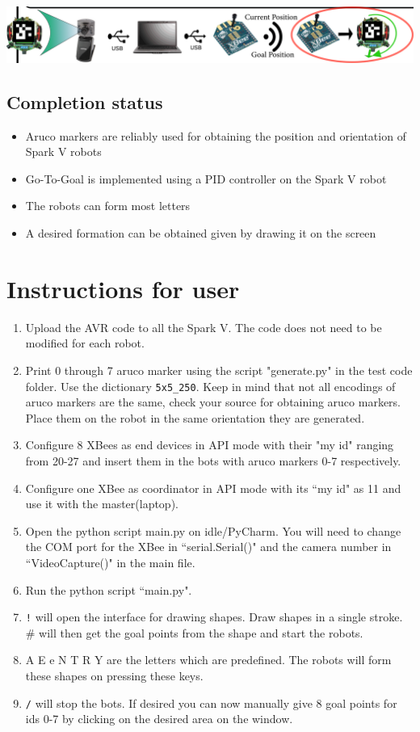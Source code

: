 \documentclass[a4paper,12pt,oneside]{book}
\begin{document}
		\includegraphics[scale = .2]{Images/flow.png}
		
	\section{Completion status}
	\begin{itemize}
		\item Aruco markers are reliably used for obtaining the position and orientation of Spark V robots
		\item Go-To-Goal is implemented using a PID controller on the Spark V robot
		\item The robots can form most letters 
		\item A desired formation can be obtained given by drawing it on the screen
	\end{itemize}
		
	
	
	
	
	
	\chapter[Instructions for user]{Instructions for user}
	\begin{enumerate}
		\item Upload the AVR code to all the Spark V. The code does not need to be modified for each robot.
		\item Print 0 through 7 aruco marker using the script "generate.py" in the test code folder. Use the dictionary \verb|5x5_250|. Keep in mind that not all encodings of aruco markers are the same, check your source for obtaining aruco markers. Place them on the robot in the same orientation they are generated.
		\item Configure 8 XBees as end devices in API mode with their "my id" ranging from 20-27 and insert them in the bots with aruco markers 0-7 respectively.
		\item Configure one XBee as coordinator in API mode with its ``my id" as 11 and use it with the master(laptop).
		\item Open the python script main.py on idle/PyCharm. You will need to change the COM port for the XBee in ``serial.Serial()" and the camera number in ``VideoCapture()" in the main file.
		\item Run the python script ``main.py".
		\item \verb|!| will open the interface for drawing shapes. Draw shapes in a single stroke. \# will then get the goal points from the shape and start the robots.
		\item A E e N T R Y are the letters which are predefined. The robots will form these shapes on pressing these keys.
		\item \verb|/| will stop the bots. If desired you can now manually give 8 goal points for ids 0-7 by clicking on the desired area on the window.
	\end{enumerate}
	
\end{document}

